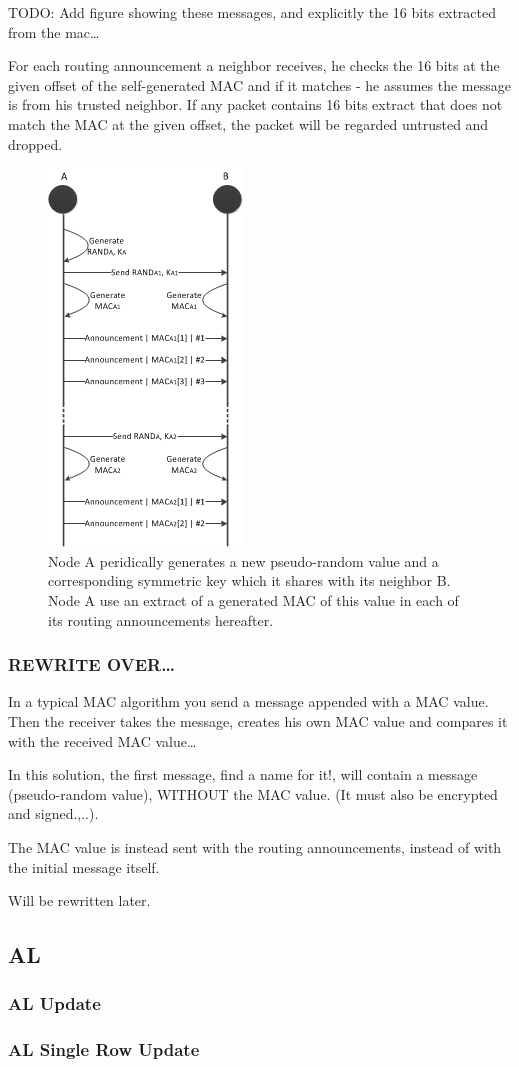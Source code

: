 TODO: Add figure showing these messages, and explicitly the 16 bits extracted
from the mac\ldots

For each routing announcement a neighbor receives, he checks the 16 bits at the
given offset of the self-generated \ac{MAC} and if it matches - he assumes the
message is from his trusted neighbor. If any packet contains 16 bits extract
that does not match the \ac{MAC} at the given offset, the packet will be
regarded untrusted and dropped.

\begin{figure}[h]
	\centering
  	\includegraphics{images/mac_ogm_msc.png}
  	\caption{Node A peridically generates a new pseudo-random value and a
  	corresponding symmetric key which it shares with its neighbor B. Node A use
  	an extract of a generated MAC of this value in each of its routing
  	announcements hereafter.}
	\label{fig:mac_ogm_msc}
\end{figure}

\subsubsection*{REWRITE OVER\ldots}
In a typical MAC algorithm you send a message appended with a MAC value. Then
the receiver takes the message, creates his own MAC value and compares it with
the received MAC value\ldots 

In this solution, the first message, find a name for it!, will contain a message
(pseudo-random value), WITHOUT the MAC value. (It must also be encrypted and
signed.,..). 

The MAC value is instead sent with the routing announcements, instead of with
the initial message itself.

Will be rewritten later.

\subsection{\acf{AL}}

\subsubsection*{\acf{AL} Update}

\subsubsection*{\acf{AL} Single Row Update}